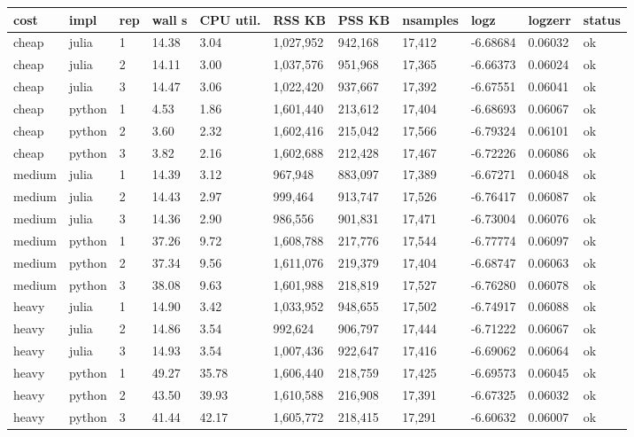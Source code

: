 \begin{tabular}{lllllllllll}
\toprule
cost & impl & rep & wall s & CPU util. & RSS KB & PSS KB & nsamples & logz & logzerr & status \\
\midrule
cheap & julia & 1 & 14.38 & 3.04 & 1,027,952 & 942,168 & 17,412 & -6.68684 & 0.06032 & ok \\
cheap & julia & 2 & 14.11 & 3.00 & 1,037,576 & 951,968 & 17,365 & -6.66373 & 0.06024 & ok \\
cheap & julia & 3 & 14.47 & 3.06 & 1,022,420 & 937,667 & 17,392 & -6.67551 & 0.06041 & ok \\
cheap & python & 1 & 4.53 & 1.86 & 1,601,440 & 213,612 & 17,404 & -6.68693 & 0.06067 & ok \\
cheap & python & 2 & 3.60 & 2.32 & 1,602,416 & 215,042 & 17,566 & -6.79324 & 0.06101 & ok \\
cheap & python & 3 & 3.82 & 2.16 & 1,602,688 & 212,428 & 17,467 & -6.72226 & 0.06086 & ok \\
medium & julia & 1 & 14.39 & 3.12 & 967,948 & 883,097 & 17,389 & -6.67271 & 0.06048 & ok \\
medium & julia & 2 & 14.43 & 2.97 & 999,464 & 913,747 & 17,526 & -6.76417 & 0.06087 & ok \\
medium & julia & 3 & 14.36 & 2.90 & 986,556 & 901,831 & 17,471 & -6.73004 & 0.06076 & ok \\
medium & python & 1 & 37.26 & 9.72 & 1,608,788 & 217,776 & 17,544 & -6.77774 & 0.06097 & ok \\
medium & python & 2 & 37.34 & 9.56 & 1,611,076 & 219,379 & 17,404 & -6.68747 & 0.06063 & ok \\
medium & python & 3 & 38.08 & 9.63 & 1,601,988 & 218,819 & 17,527 & -6.76280 & 0.06078 & ok \\
heavy & julia & 1 & 14.90 & 3.42 & 1,033,952 & 948,655 & 17,502 & -6.74917 & 0.06088 & ok \\
heavy & julia & 2 & 14.86 & 3.54 & 992,624 & 906,797 & 17,444 & -6.71222 & 0.06067 & ok \\
heavy & julia & 3 & 14.93 & 3.54 & 1,007,436 & 922,647 & 17,416 & -6.69062 & 0.06064 & ok \\
heavy & python & 1 & 49.27 & 35.78 & 1,606,440 & 218,759 & 17,425 & -6.69573 & 0.06045 & ok \\
heavy & python & 2 & 43.50 & 39.93 & 1,610,588 & 216,908 & 17,391 & -6.67325 & 0.06032 & ok \\
heavy & python & 3 & 41.44 & 42.17 & 1,605,772 & 218,415 & 17,291 & -6.60632 & 0.06007 & ok \\
\bottomrule
\end{tabular}
